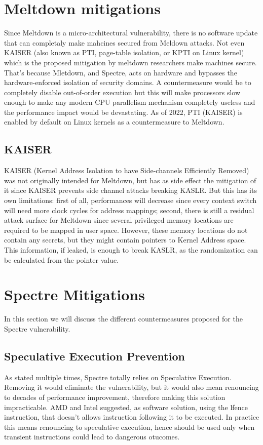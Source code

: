 \section{Meltdown mitigations}
Since Meltdown is a micro-architectural vulnerability, there is no software update that can completaly make mahcines secured from Meldown attacks.
Not even KAISER (also known as PTI, page-table isolation, or KPTI on Linux kernel) which is the proposed
mitigation by meltdown researchers make machines secure. That's because
Mletdown, and Spectre, acts on hardware and bypasses the hardware-enforced isolation of security domains.
A countermeasure would be to completely disable out-of-order execution but this will make processors slow enough to make any modern CPU parallelism mechanism
completely useless and the performance impact would be devastating. As of 2022, PTI (KAISER) is enabled by default on Linux kernels as a countermeasure to Meltdown.
\subsection{KAISER}
KAISER (Kernel Address Isolation to have Side-channels Efficiently Removed) was not originally intended for Meltdown, but has as side effect the mitigation of it
since KAISER prevents side channel attacks breaking KASLR. But this has its own limitations: first of all, performances will decrease since every context switch will
need more clock cycles for address mappings; second, there is still a residual attack surface for Meltdown since several privileged memory locations are required
to be mapped in user space. However, these memory locations do not contain any secrets, but they might contain pointers to Kernel Address space. This information, if leaked,
is enough to break KASLR, as the randomization can be calculated from the pointer value.

\section{Spectre Mitigations}
In this section we will discuss the different countermeasures proposed for the Spectre vulnerability.
\subsection{Speculative Execution Prevention}
As stated multiple times, Spectre totally relies on Speculative Execution. 
Removing it would eliminate the vulnerability, but it would also mean renouncing to decades of performance improvement, therefore making this solution impracticable.
AMD and Intel suggested, as software solution, using the lfence instruction, that doesn't allows instruction following it to be executed.
In practice this means renouncing to speculative execution, hence should be used only when transient instructions could lead to dangerous otucomes.
